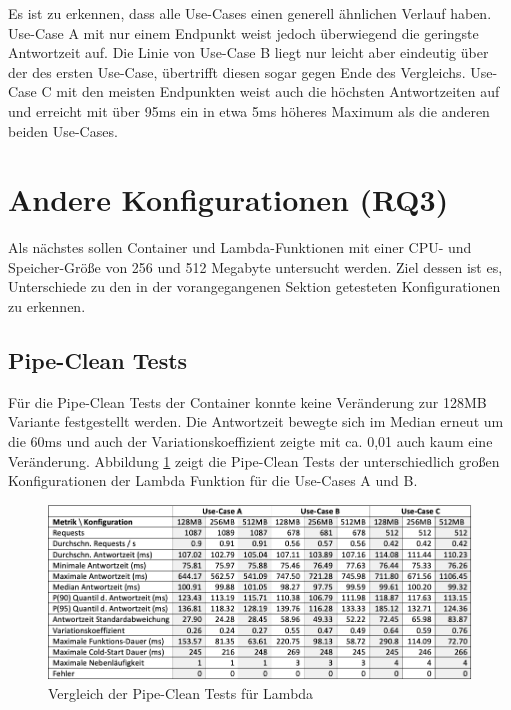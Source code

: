 Es ist zu erkennen, dass alle Use-Cases einen generell ähnlichen Verlauf haben. Use-Case A mit nur einem Endpunkt weist jedoch überwiegend die geringste Antwortzeit auf. Die Linie von Use-Case B liegt nur leicht aber eindeutig über der des ersten Use-Case, übertrifft diesen sogar gegen Ende des Vergleichs. Use-Case C mit den meisten Endpunkten weist auch die höchsten Antwortzeiten auf und erreicht mit über 95ms ein in etwa 5ms höheres Maximum als die anderen beiden Use-Cases.  


\section{Andere Konfigurationen (RQ3)}
Als nächstes sollen Container und Lambda-Funktionen mit einer CPU- und Speicher-Größe von 256 und 512 Megabyte untersucht werden. Ziel dessen ist es, Unterschiede zu den in der vorangegangenen Sektion getesteten Konfigurationen zu erkennen.

\subsection{Pipe-Clean Tests}
Für die Pipe-Clean Tests der Container konnte keine Veränderung zur 128MB Variante festgestellt werden. Die Antwortzeit bewegte sich im Median erneut um die 60ms und auch der Variationskoeffizient zeigte mit ca. 0,01 auch kaum eine Veränderung.
Abbildung \ref{fig:pipe-comparison} zeigt die Pipe-Clean Tests der unterschiedlich großen Konfigurationen der Lambda Funktion für die Use-Cases A und B.

\begin{figure}[H]
    \includegraphics[width=\textwidth]{img/pipe-comparison.png}
    \caption[Vergleich der Pipe-Clean Tests für Lambda]{Vergleich der Pipe-Clean Tests für Lambda}
    \label{fig:pipe-comparison}
\end{figure}

